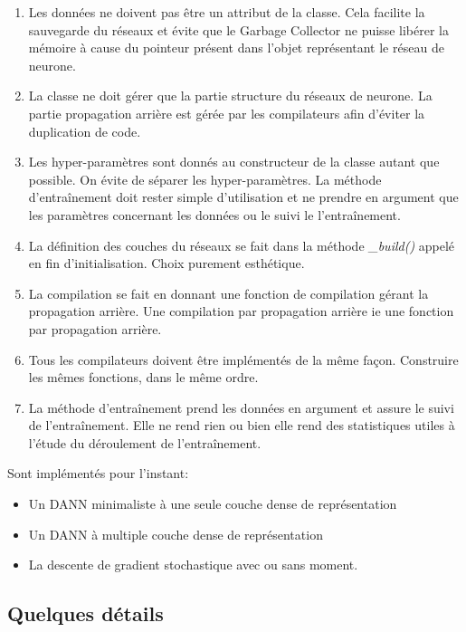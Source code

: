 \begin{enumerate}
	\item Les données ne doivent pas être un attribut de la classe. Cela 
	facilite la sauvegarde du réseaux et évite que le Garbage Collector ne puisse 
	libérer la mémoire à cause du pointeur présent dans l'objet représentant 
	le réseau de neurone.
	\item La classe ne doit gérer que la partie structure du réseaux de neurone.
	La partie propagation arrière est gérée par les compilateurs afin d'éviter 
	la duplication de code.
	\item Les hyper-paramètres sont donnés au constructeur de la classe autant
	que possible. On évite de séparer les hyper-paramètres. La méthode 
	d'entraînement doit rester simple d'utilisation et ne prendre en argument 
	que les paramètres concernant les données ou le suivi le l'entraînement.
	\item La définition des couches du réseaux se fait dans la méthode 
	\emph{\_build()} appelé en fin d'initialisation. Choix purement esthétique.
	\item La compilation se fait en donnant une fonction de compilation
	gérant la propagation arrière. Une compilation par propagation arrière ie
	une fonction par propagation arrière.
	\item Tous les compilateurs doivent être implémentés de la même façon. 
	Construire les mêmes fonctions, dans le même ordre.
	\item La méthode d'entraînement prend les données en argument et assure le
	suivi de l'entraînement. Elle ne rend rien ou bien elle rend des statistiques
	utiles à l'étude du déroulement de l'entraînement.
\end{enumerate}

Sont implémentés pour l'instant:
\begin{itemize}
	\item Un DANN minimaliste à une seule couche dense de représentation
	\item Un DANN à multiple couche dense de représentation
	\item La descente de gradient stochastique avec ou sans moment.
\end{itemize}

\subsection{Quelques détails} %
\label{sub:quelques_details}

